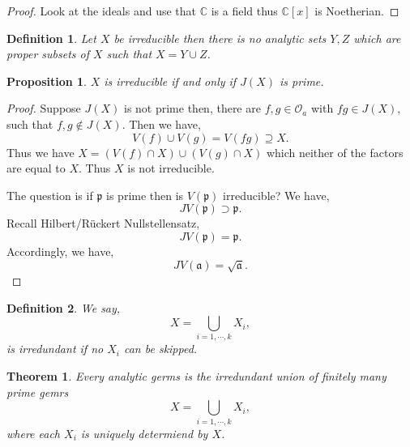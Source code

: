 \documentclass{article}
\newtheorem{theorem}{Theorem} [section]
\newtheorem{proposition}{Proposition}[section]
\newtheorem{definition}{Definition}[section]
\newcommand{\C}[0]{\mathbb{C}}
\newcommand{\Ouv}[0]{\mathcal{O}}
\begin{document}
\begin{proof}
  Look at the ideals and use that $\C$ is a field thus $\C[x]$ is Noetherian.
\end{proof}


\begin{definition}
  Let $X$ be irreducible then there is no analytic sets $Y,Z$ which are proper subsets of $X$ such that $X= Y\cup Z$.
\end{definition}

\begin{proposition}
  $X$ is irreducible if and only if $J(X)$ is prime.
\end{proposition}

\begin{proof}
  Suppose $J(X)$ is not prime then, there are $f,g\in\Ouv_a$ with $fg\in J(X)$, such that $f,g\not\in J(X)$.
  Then we have,
  \begin{equation*}
    V(f)\cup V(g) = V(fg) \supseteq X.
  \end{equation*}
  Thus we have $X = (V(f)\cap X)\cup (V(g)\cap X)$ which neither of the factors are equal to $X$. Thus $X$ is not irreducible.
  \par The question is if $\mathfrak{p}$ is prime then is $V(\mathfrak{p})$ irreducible? We have,
  \begin{equation*}
    JV(\mathfrak{p})\supset \mathfrak{p}.
  \end{equation*}
  Recall Hilbert/Rückert Nullstellensatz,
  \begin{equation*}
    JV(\mathfrak{p}) = \mathfrak{p}.
  \end{equation*}
  Accordingly, we have,
  \begin{equation*}
    JV(\mathfrak{a}) = \sqrt{\mathfrak{a}}.
  \end{equation*}
\end{proof}

\begin{definition}
  We say,
  \begin{equation*}
    X = \bigcup_{i=1,\cdots,k}X_i,
  \end{equation*}
  is irredundant if no $X_i$ can be skipped.
\end{definition}

\begin{theorem}
  Every analytic germs is the irredundant union of finitely many prime gemrs
  \begin{equation*}
    X=\bigcup_{i=1,\cdots,k}X_i,
  \end{equation*}
where each $X_i$ is uniquely determiend by $X$.
\end{theorem}
\end{document}
